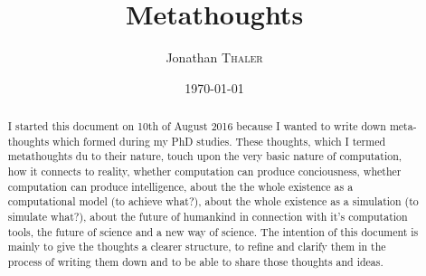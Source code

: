\documentclass{article}
\title{Metathoughts} %
\author{Jonathan \textsc{Thaler}} %
\date{\today} %
\begin{document}
\maketitle %

\begin{abstract}
I started this document on 10th of August 2016 because I wanted to write down meta-thoughts which formed during my PhD studies. These thoughts, which I termed metathoughts du to their nature, touch upon the very basic nature of computation, how it connects to reality, whether computation can produce conciousness, whether computation can produce intelligence, about the the whole existence as a computational model (to achieve what?), about the whole existence as a simulation (to simulate what?), about the future of humankind in connection with it's computation tools, the future of science and a new way of science. The intention of this document is mainly to give the thoughts a clearer structure, to refine and clarify them in the process of writing them down and to be able to share those thoughts and ideas.
\end{abstract}
\end{document}
